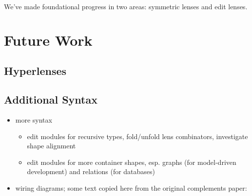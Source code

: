 We've made foundational progress in two areas: symmetric lenses and edit
lenses.

\section{Future Work}
\label{sec:future}

\subsection{Hyperlenses}
\label{sec:future-hyperlenses}

\subsection{Additional Syntax}
\label{sec:future-syntax}
\begin{itemize}
    \item more syntax
        \begin{itemize}
            \item edit modules for recursive types, fold/unfold lens combinators,
                investigate shape alignment
            \item edit modules for more container shapes, esp. graphs (for
                model-driven development) and relations (for databases)
        \end{itemize}
    \item wiring diagrams; some text copied here from the original
        complements paper:


\end{itemize}
